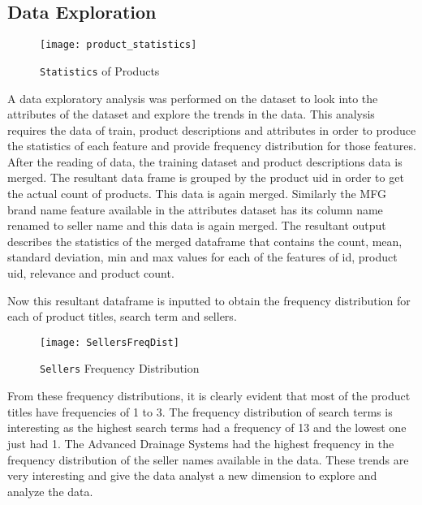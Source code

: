 \documentclass{sig-alternate-05-2015}
\begin{document}
\subsection{Data Exploration}
\begin{figure}
\centering
\texttt{[image: product\_statistics]}
\caption{\texttt{Statistics} of Products}
\end{figure}
A data exploratory analysis was performed on the dataset to look into the attributes of the dataset and explore the trends in the data. This analysis requires the data of train, product descriptions and attributes in order to produce the statistics of each feature and provide frequency distribution for those features. After the reading of data, the training dataset and product descriptions data is merged. The resultant data frame is grouped by the product uid in order to get the actual count of products. This data is again merged. Similarly the MFG brand name feature available in the attributes dataset has its column name renamed to seller name and this data is again merged. The resultant output describes the statistics of the merged dataframe that contains the count, mean, standard deviation, min and max values for each of the features of id, product uid, relevance and product count.


Now this resultant dataframe is inputted to obtain the frequency distribution for each of product titles, search term and sellers.

\begin{figure}
\centering
\texttt{[image: SellersFreqDist]}
\caption{\texttt{Sellers} Frequency Distribution}
\end{figure}

From these frequency distributions, it is clearly evident that most of the product titles have frequencies of 1 to 3. The frequency distribution of search terms is interesting as the highest search terms had a frequency of 13 and the lowest one just had 1. The Advanced  Drainage  Systems had the highest frequency in the frequency distribution of the seller names available in the data. These trends are very interesting and give the data analyst a new dimension to explore and analyze the data.
\newline 
\end{document}
